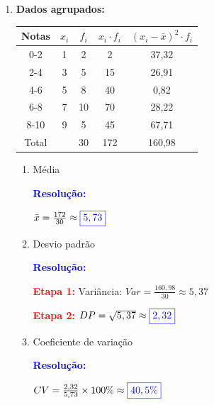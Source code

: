 \documentclass[11pt]{article}
\newcommand{\respostaNum}[1]{\textcolor{blue}{\boxed{#1}}}
\newcommand{\respostaTxt}[1]{\textcolor{blue}{#1}}
\newcommand{\resolucao}{\textbf{\textcolor{blue}{Resolução:}}}
\begin{document}
\begin{multicols}{2}
\begin{enumerate}[leftmargin=*, start=11]
Empresa A: $\bar{x} = 3000$, $DP = 600$

Empresa B: $\bar{x} = 5000$, $DP = 800$

\resolucao

\textbf{\textcolor{red}{Etapa 1:}} Calcular CV da Empresa A
\[
CV_A = \frac{600}{3000} \times 100\% = 0,2 \times 100\% = 20\%
\]

\textbf{\textcolor{red}{Etapa 2:}} Calcular CV da Empresa B
\[
CV_B = \frac{800}{5000} \times 100\% = 0,16 \times 100\% = 16\%
\]

\textbf{\textcolor{red}{Etapa 3:}} Comparar: $16\% < 20\%$

\respostaTxt{Empresa B tem menor dispersão relativa (16\% < 20\%)}

\item \textbf{Dados agrupados:}

\begin{center}
\begin{tabular}{|c|c|c|c|c|}
\hline
Notas & $x_i$ & $f_i$ & $x_i \cdot f_i$ & $(x_i - \bar{x})^2 \cdot f_i$ \\
\hline
0-2 & 1 & 2 & 2 & 37,32 \\
2-4 & 3 & 5 & 15 & 26,91 \\
4-6 & 5 & 8 & 40 & 0,82 \\
6-8 & 7 & 10 & 70 & 28,22 \\
8-10 & 9 & 5 & 45 & 67,71 \\
\hline
Total & & 30 & 172 & 160,98 \\
\hline
\end{tabular}
\end{center}

\begin{enumerate}[label=\alph*)]
\item Média

\resolucao

$\bar{x} = \frac{172}{30} \approx \respostaNum{5,73}$

\item Desvio padrão

\resolucao

\textbf{\textcolor{red}{Etapa 1:}} Variância: $Var = \frac{160,98}{30} \approx 5,37$

\textbf{\textcolor{red}{Etapa 2:}} $DP = \sqrt{5,37} \approx \respostaNum{2,32}$

\item Coeficiente de variação

\resolucao

$CV = \frac{2,32}{5,73} \times 100\% \approx \respostaNum{40,5\%}$


\end{enumerate}
\end{enumerate}
\end{multicols}
\end{document}
